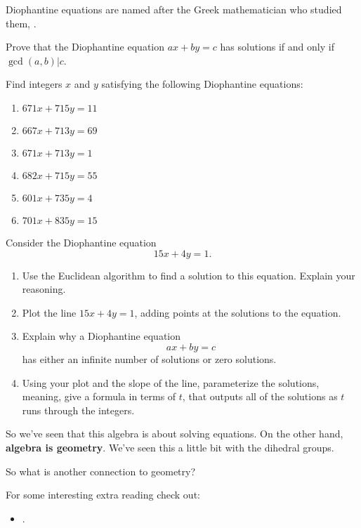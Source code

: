 \documentclass{ximera}
\begin{document}
Diophantine equations are named after the Greek mathematician who
studied them, .

\begin{exercise}
  Prove that the Diophantine equation $ax + by = c$ has solutions if
  and only if $\gcd(a,b)|c$.
\end{exercise}

\begin{exercise}
  Find integers $x$ and $y$ satisfying the following Diophantine
  equations:
  \begin{enumerate}
  \item $671x + 715 y = 11$ 
  \item $667x + 713 y = 69$ 
  \item $671x + 713 y = 1$
  \item $682x + 715 y = 55$
  \item $601x + 735 y = 4$
  \item $701x + 835 y = 15$
  \end{enumerate}
\end{exercise}

\begin{exercise}
  Consider the Diophantine equation
  \[
  15x + 4y = 1.
  \]
  \begin{enumerate}
  \item Use the Euclidean algorithm to find a solution to this
    equation. Explain your reasoning.
  \item Plot the line $15x + 4y = 1$, adding points at the solutions
    to the equation.
  \item Explain why a Diophantine equation 
    \[
    ax + by = c
    \]
  has either an infinite number of solutions or zero solutions.
\item Using your plot and the slope of the line, parameterize the
  solutions, meaning, give a formula in terms of $t$, that outputs all
  of the solutions as $t$ runs through the integers.
  \end{enumerate}
\end{exercise}


So we've seen that this algebra is about solving equations. On the
other hand, \textbf{algebra is geometry}. We've seen this a little bit
with the dihedral groups.


\begin{question}
  So what is another connection to geometry?
\end{question}


For some interesting extra reading check out:
\begin{itemize}
\item {}.
\end{itemize}
\end{document}
